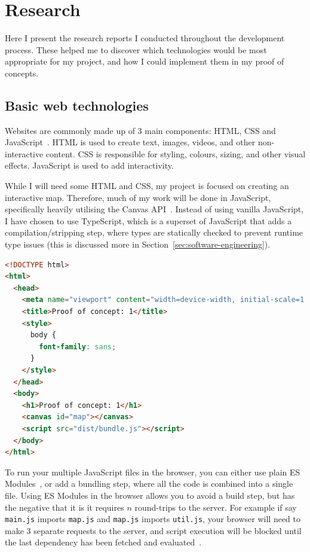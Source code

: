 \documentclass{final_report}
\begin{document}
\clearpage
\chapter{Research}

Here I present the research reports I conducted throughout the development process. These helped me to discover which technologies would be most appropriate for my project, and how I could implement them in my proof of concepts.

\section{Basic web technologies}

Websites are commonly made up of 3 main components: HTML, CSS and JavaScript~\cite{mdn-html}. HTML is used to create text, images, videos, and other non-interactive content. CSS is responsible for styling, colours, sizing, and other visual effects. JavaScript is used to add interactivity.

While I will need some HTML and CSS, my project is focused on creating an interactive map. Therefore, much of my work will be done in JavaScript, specifically heavily utilising the Canvas API~\cite{mdn-canvas-api}. Instead of using vanilla JavaScript, I have chosen to use TypeScript, which is a superset of JavaScript that adds a compilation/stripping step, where types are statically checked to prevent runtime type issues (this is discussed more in Section~\ref{sec:software-engineering}).

\begin{lstlisting}[caption=Basic HTML to run an external script with some basic styling, language=html]
<!DOCTYPE html>
<html>
  <head>
    <meta name="viewport" content="width=device-width, initial-scale=1.0" />
    <title>Proof of concept: 1</title>
    <style>
      body {
        font-family: sans;
      }
    </style>
  </head>
  <body>
    <h1>Proof of concept: 1</h1>
    <canvas id="map"></canvas>
    <script src="dist/bundle.js"></script>
  </body>
</html>
\end{lstlisting}

To run your multiple JavaScript files in the browser, you can either use plain ES Modules~\cite{mdn-es-modules}, or add a bundling step, where all the code is combined into a single file. Using ES Modules in the browser allows you to avoid a build step, but has the negative that it is it requires \(n\) round-trips to the server. For example if say \texttt{main.js} imports \texttt{map.js} and \texttt{map.js} imports \texttt{util.js}, your browser will need to make 3 separate requests to the server, and script execution will be blocked until the last dependency has been fetched and evaluated~\cite{sitepoint-using-es-modules}. 
\end{document}
